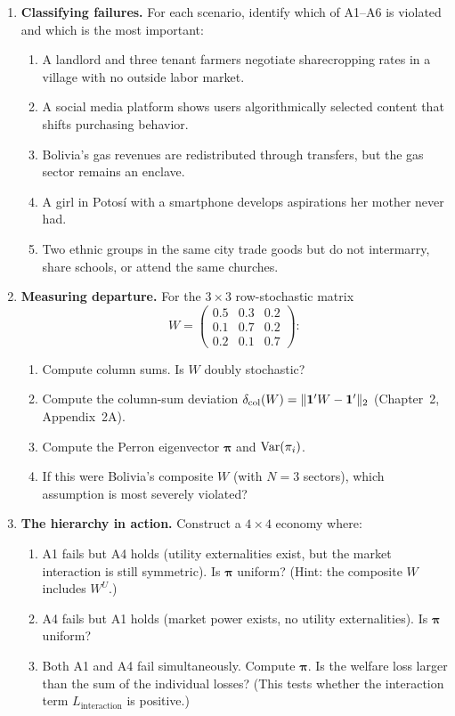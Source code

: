 \documentclass[../structural_economics_book.tex]{subfiles}
\begin{document}
\begin{enumerate}[label=\textbf{4.\arabic*}, leftmargin=3em]

\item \textbf{Classifying failures.} For each scenario, identify which of A1--A6 is violated and which is the most important:
\begin{enumerate}
\item A landlord and three tenant farmers negotiate sharecropping rates in a village with no outside labor market.
\item A social media platform shows users algorithmically selected content that shifts purchasing behavior.
\item Bolivia's gas revenues are redistributed through transfers, but the gas sector remains an enclave.
\item A girl in Potos\'{i} with a smartphone develops aspirations her mother never had.
\item Two ethnic groups in the same city trade goods but do not intermarry, share schools, or attend the same churches.
\end{enumerate}

\item \textbf{Measuring departure.} For the $3 \times 3$ row-stochastic matrix
\begin{equation*}
W = \begin{pmatrix} 0.5 & 0.3 & 0.2 \\ 0.1 & 0.7 & 0.2 \\ 0.2 & 0.1 & 0.7 \end{pmatrix}:
\end{equation*}
\begin{enumerate}
\item Compute column sums. Is $W$ doubly stochastic?
\item Compute the column-sum deviation $\delta_{\text{col}}(W) = \|\mathbf{1}'W - \mathbf{1}'\|_2$ (Chapter~2, Appendix~2A).
\item Compute the Perron eigenvector $\boldsymbol{\pi}$ and $\operatorname{Var}(\pi_i)$.
\item If this were Bolivia's composite $W$ (with $N = 3$ sectors), which assumption is most severely violated?
\end{enumerate}

\item \textbf{The hierarchy in action.} Construct a $4 \times 4$ economy where:
\begin{enumerate}
\item A1 fails but A4 holds (utility externalities exist, but the market interaction is still symmetric). Is $\boldsymbol{\pi}$ uniform? (Hint: the composite $W$ includes $W^U$.)
\item A4 fails but A1 holds (market power exists, no utility externalities). Is $\boldsymbol{\pi}$ uniform?
\item Both A1 and A4 fail simultaneously. Compute $\boldsymbol{\pi}$. Is the welfare loss larger than the sum of the individual losses? (This tests whether the interaction term $L_{\text{interaction}}$ is positive.)
\end{enumerate}


\end{enumerate}
\end{document}
